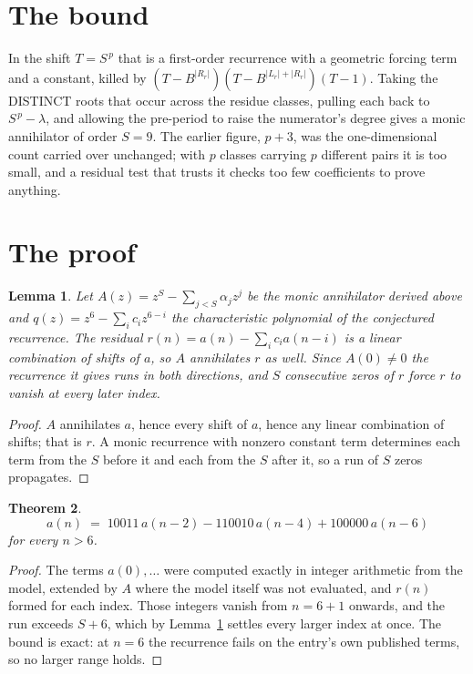 \documentclass[11pt,a4paper]{article}
\theoremstyle{plain}
\newtheorem{theorem}{Theorem}
\newtheorem{lemma}[theorem]{Lemma}
\theoremstyle{definition}
\begin{document}
\section{The bound}

In the shift $T=S^{\,p}$ that is a first-order recurrence with a geometric forcing term and a
constant, killed by $(T-B^{|R_r|})(T-B^{|L_r|+|R_r|})(T-1)$. Taking the DISTINCT roots that
occur across the residue classes, pulling each back to $S^{\,p}-\lambda$, and allowing the
pre-period to raise the numerator's degree gives a monic annihilator of order $S=9$. The
earlier figure, $p+3$, was the one-dimensional count carried over unchanged; with $p$ classes
carrying $p$ different pairs it is too small, and a residual test that trusts it checks too few
coefficients to prove anything.

\section{The proof}

\begin{lemma}\label{lem:crit}
Let $A(z)=z^S-\sum_{j<S}\alpha_jz^{j}$ be the monic annihilator derived above and
$q(z)=z^{6}-\sum_ic_iz^{6-i}$ the characteristic polynomial of the conjectured
recurrence. The residual $r(n)=a(n)-\sum_ic_ia(n-i)$ is a linear combination of shifts of $a$,
so $A$ annihilates $r$ as well. Since $A(0)\ne0$ the recurrence it gives runs in both
directions, and $S$ consecutive zeros of $r$ force $r$ to vanish at every later index.
\end{lemma}

\begin{proof}
$A$ annihilates $a$, hence every shift of $a$, hence any linear combination of shifts; that is
$r$. A monic recurrence with nonzero constant term determines each term from the $S$ before it
and each from the $S$ after it, so a run of $S$ zeros propagates.
\end{proof}

\begin{theorem}
\[
a(n)\;=\;10011\,a(n-2) - 110010\,a(n-4) + 100000\,a(n-6)
\]
for every $n>6$.
\end{theorem}

\begin{proof}
The terms $a(0),\dots$ were computed exactly in integer arithmetic from the model, extended by
$A$ where the model itself was not evaluated, and $r(n)$ formed for each index. Those integers
vanish from $n=6+1$ onwards, and the run exceeds $S+6$, which by
Lemma~\ref{lem:crit} settles every larger index at once. The bound is exact: at $n=6$ the recurrence fails on the entry's own published terms, so no larger range holds.
\end{proof}
\end{document}
